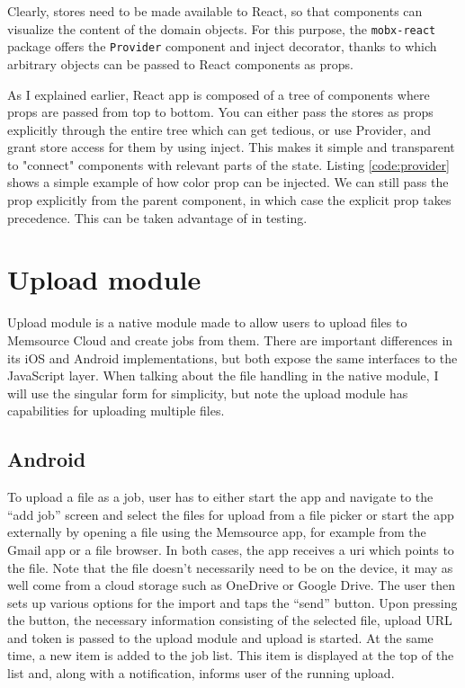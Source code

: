 Clearly, stores need to be made available to React, so that components can visualize the content of the domain objects. For this purpose, the \texttt{mobx-react} package offers the \texttt{Provider} component and inject decorator, thanks to which arbitrary objects can be passed to React components as props. 

As I explained earlier, React app is composed of a tree of components where props are passed from top to bottom. You can either pass the stores as props explicitly through the entire tree which can get tedious, or use Provider, and grant store access for them by using inject. This makes it simple and transparent to "connect" components with relevant parts of the state. Listing \ref{code:provider} shows a simple example of how color prop can be injected. We can still pass the prop explicitly from the parent component, in which case the explicit prop takes precedence. This can be taken advantage of in testing.




\section{Upload module}
Upload module is a native module made to allow users to upload files to Memsource Cloud and create jobs from them. There are important differences in its iOS and Android implementations, but both expose the same interfaces to the JavaScript layer. When talking about the file handling in the native module, I will use the singular form for simplicity, but note the upload module has capabilities for uploading multiple files.


\subsection{Android}
To upload a file as a job, user has to either start the app and navigate to the “add job” screen and select the files for upload from a file picker or start the app externally by opening a file using the Memsource app, for example from the Gmail app or a file browser. 
In both cases, the app receives a uri which points to the file. Note that the file doesn't necessarily need to be on the device, it may as well come from a cloud storage such as OneDrive or Google Drive. The user then sets up various options for the import and taps the “send” button. 
Upon pressing the button, the necessary information consisting of the selected file, upload URL and token is passed to the upload module and upload is started. At the same time, a new item is added to the job list. This item is displayed at the top of the list and, along with a notification, informs user of the running upload.


